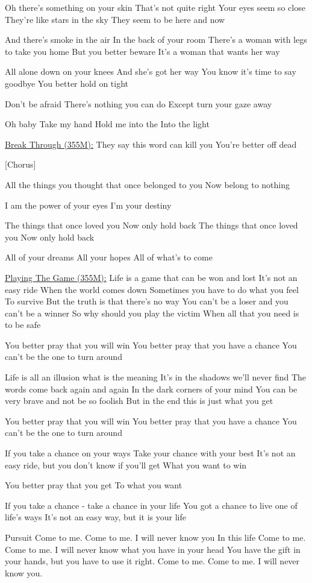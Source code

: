 \documentclass[11pt]{article}
\begin{document}
Oh there's something on your skin
That's not quite right
Your eyes seem so close
They're like stars in the sky
They seem to be here and now

And there's smoke in the air
In the back of your room
There's a woman with legs to take you home
But you better beware
It's a woman that wants her way

All alone down on your knees
And she's got her way
You know it's time to say goodbye
You better hold on tight

Don't be afraid
There's nothing you can do
Except turn your gaze away

Oh baby
Take my hand
Hold me into the
Into the light

\underline{Break Through (355M):}
They say this word can kill you
You're better off dead

[Chorus]

All the things you thought that once belonged to you
Now belong to nothing

I am the power of your eyes
I'm your destiny

The things that once loved you
Now only hold back
The things that once loved you
Now only hold back

All of your dreams
All your hopes
All of what's to come

\underline{Playing The Game (355M):}
Life is a game that can be won and lost
It's not an easy ride
When the world comes down
Sometimes you have to do what you feel
To survive
But the truth is that there's no way
You can't be a loser and you can't be a winner
So why should you play the victim
When all that you need is to be safe

You better pray that you will win
You better pray that you have a chance
You can't be the one to turn around

Life is all an illusion what is the meaning
It's in the shadows we'll never find
The words come back again and again
In the dark corners of your mind
You can be very brave and not be so foolish
But in the end this is just what you get

You better pray that you will win
You better pray that you have a chance
You can't be the one to turn around

If you take a chance on your ways
Take your chance with your best
It's not an easy ride, but you don't know if you'll get
What you want to win

You better pray that you get
To what you want

If you take a chance - take a chance in your life
You got a chance to live one of life's ways
It's not an easy way, but it is your life

Pursuit
Come to me. Come to me. I will never know you
In this life
Come to me. Come to me. I will never know what you have in your head
You have the gift in your hands, but you have to use it right.
Come to me. Come to me. I will never know you.








\end{document}
